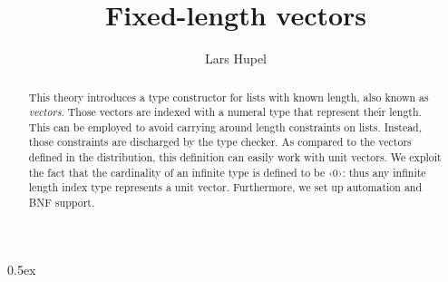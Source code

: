\documentclass[11pt,a4paper]{article}
\begin{document}
\title{Fixed-length vectors}
\author{Lars Hupel}

\maketitle

\begin{abstract}
This theory introduces a type constructor for lists with known length, also known as \emph{vectors}.
Those vectors are indexed with a numeral type that represent their length.
This can be employed to avoid carrying around length constraints on lists. Instead, those
constraints are discharged by the type checker.
As compared to the vectors defined in the distribution, this definition can easily work with unit
vectors. We exploit the fact that the cardinality of an infinite type is defined to be ‹0›: thus
any infinite length index type represents a unit vector.
Furthermore, we set up automation and BNF support.
\end{abstract}

\tableofcontents

\parindent 0pt\parskip 0.5ex


\end{document}

